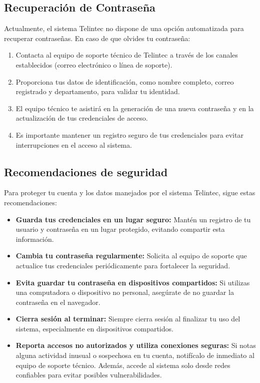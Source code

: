 \subsection{Recuperación de Contraseña }
\begin{justify}

Actualmente, el sistema Telintec no dispone de una opción automatizada para recuperar contraseñas. En caso de que olvides tu contraseña: 
\end{justify}
\begin{enumerate}
    \item Contacta al equipo de soporte técnico de Telintec a través de los canales establecidos (correo electrónico o línea de soporte). 
    \item Proporciona tus datos de identificación, como nombre completo, correo registrado y departamento, para validar tu identidad. 
    \item El equipo técnico te asistirá en la generación de una nueva contraseña y en la actualización de tus credenciales de acceso. 
    \item Es importante mantener un registro seguro de tus credenciales para evitar interrupciones en el acceso al sistema. 
\end{enumerate}


\subsection{Recomendaciones de seguridad}
\begin{justify}
    Para proteger tu cuenta y los datos manejados por el sistema Telintec, sigue estas recomendaciones: 

\end{justify}

\begin{itemize}
    \item \textbf{Guarda tus credenciales en un lugar seguro:} Mantén un registro de tu usuario y contraseña en un lugar protegido, evitando compartir esta información.
    
    \item \textbf{Cambia tu contraseña regularmente:} Solicita al equipo de soporte que actualice tus credenciales periódicamente para fortalecer la seguridad.
    
    \item \textbf{Evita guardar tu contraseña en dispositivos compartidos:} Si utilizas una computadora o dispositivo no personal, asegúrate de no guardar la contraseña en el navegador.
    
    \item \textbf{Cierra sesión al terminar:} Siempre cierra sesión al finalizar tu uso del sistema, especialmente en dispositivos compartidos.
    
    \item \textbf{Reporta accesos no autorizados y utiliza conexiones seguras:} Si notas alguna actividad inusual o sospechosa en tu cuenta, notifícalo de inmediato al equipo de soporte técnico. Además, accede al sistema solo desde redes confiables para evitar posibles vulnerabilidades.
\end{itemize}

       

